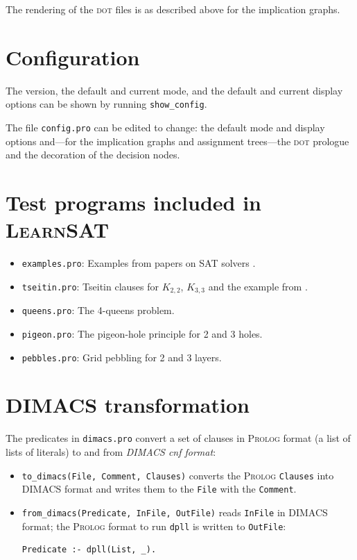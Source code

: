 \documentclass[11pt]{report}
\newcommand*{\p}[1]{\textup{\texttt{#1}}}
\newcommand*{\ls}{\textsc{LearnSAT}}
\newcommand*{\pl}{\textsc{Prolog}}
\newcommand*{\dt}{\textsc{dot}}
\begin{document}
The rendering of the \dt{} files is as described above for the
implication graphs.

\section{Configuration}


The version, the default and current mode, and the default and
current display options can be shown by running \p{show\_config}.

The file \p{config.pro} can be edited to change: the default mode and
display options and---for the implication graphs and assignment
trees---the \dt{} prologue and the decoration of the decision nodes.


\newpage


\section{Test programs included in \ls{}}

\begin{itemize}
\item \p{examples.pro}: Examples from papers on SAT
solvers \cite{mz,mlm,ms}.

\item \p{tseitin.pro}: Tseitin clauses for $K_{2,2}$,
$K_{3,3}$ and the example from \cite[Section 4.5]{mlcs}.

\item \p{queens.pro}: The 4-queens problem.

\item \p{pigeon.pro}: The pigeon-hole principle for 2 and 3 holes.

\item \p{pebbles.pro}: Grid pebbling for 2 and 3 layers.
\end{itemize}

\section{DIMACS transformation}

The predicates in \p{dimacs.pro} convert a set of clauses in
\pl{} format (a list of lists of literals) to and from \emph{DIMACS cnf
format}:
\begin{itemize}
\item \p{to\_dimacs(File, Comment, Clauses)} converts the \pl{}
\p{Clauses} into DIMACS format and writes them to the \p{File} with the
\p{Comment}.
\item \p{from\_dimacs(Predicate, InFile, OutFile)} reads \p{InFile} in
DIMACS format; the \pl{} format to run \p{dpll} is written to
\p{OutFile}:
\begin{verbatim}
Predicate :- dpll(List, _).
\end{verbatim}
\end{itemize}
\end{document}

